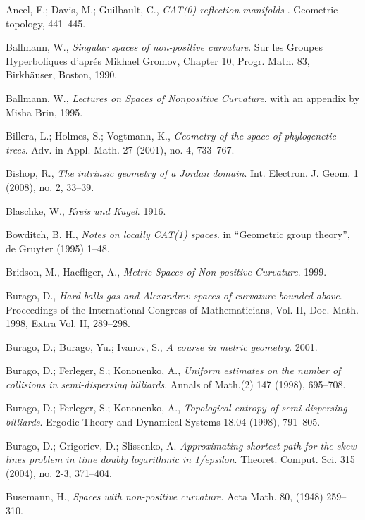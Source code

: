 \begin{thebibliography}{52}
 Ancel, F.; Davis, M.; Guilbault, C.,
\textit{CAT(0) reflection manifolds} .
Geometric topology, 
441--445.

Ballmann, W., 
\textit{Singular spaces of non-positive curvature}. 
Sur les Groupes Hyperboliques d'apr\'{e}s Mikhael Gromov, Chapter 10, Progr. Math. 83, Birkh\"auser, Boston, 1990. 

Ballmann, W., \textit{Lectures on Spaces of Nonpositive Curvature}.
with an appendix by Misha Brin, 1995. 

Billera, L.; 
Holmes, S.; 
Vogtmann, K., 
\textit{Geometry of the space of phylogenetic trees}.
Adv. in Appl. Math. 
27 
(2001), 
no. 4, 
733--767.

Bishop, R., 
\textit{The intrinsic geometry of a Jordan domain}. 
Int. Electron. J. Geom. 
1 
(2008), 
no. 2, 
33--39.

Blaschke, W., 
\textit{Kreis und Kugel}. 1916.

Bowditch, B. H.,
\textit{Notes on locally CAT(1) spaces}.
in ``Geometric group theory'', 
de Gruyter (1995) 1--48.

Bridson, M., 
Haefliger, A.,
\textit{Metric Spaces of Non-positive Curvature}. 1999.

Burago, D., 
\textit{Hard balls gas and Alexandrov spaces of curvature bounded above}.
Proceedings of the International Congress of Mathematicians, Vol. II, 
Doc. Math. 1998, 
Extra Vol. II, 
289--298.

Burago, D.; 
Burago, Yu.; 
Ivanov, S., 
\textit{A course in metric geometry}. 2001. 

Burago, D.; 
Ferleger, S.; 
Kononenko, A.,
\textit{Uniform estimates on the number of collisions in semi-dispersing billiards}.
Annals of Math.(2) 147 (1998), 695--708.

Burago, D.; 
Ferleger, S.;
Kononenko, A., 
\textit{Topological entropy of semi-dispersing billiards}.
Ergodic Theory and Dynamical Systems 
18.04 
(1998), 
791--805.

Burago, D.; Grigoriev, D.; Slissenko, A.
\textit{Approximating shortest path for the skew lines problem in time doubly logarithmic in 1/epsilon}. 
Theoret. Comput. Sci. 
315 (2004), 
no. 2-3, 
371--404. 

Busemann, H., 
\textit{Spaces with non-positive curvature}.
Acta Math. 
80, 
(1948) 
259--310.


\end{thebibliography}

